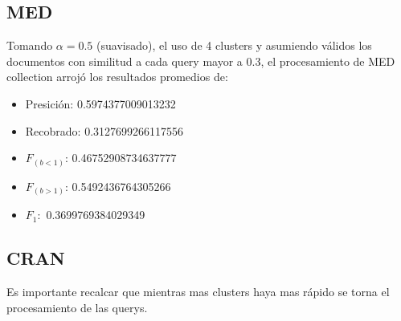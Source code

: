 \documentclass{llncs}
\begin{document}
	\subsection{MED}
	Tomando $\alpha=0.5$ (suavisado), el uso de 4 clusters y asumiendo v\'alidos los documentos con similitud a cada query mayor a 0.3, el procesamiento de MED collection arroj\'o los resultados promedios de:
	
	\begin{itemize}
		\item Presici\'on: 0.5974377009013232
		\item Recobrado: 0.3127699266117556
		\item $F_{(b<1)}$: 0.46752908734637777
		\item $F_{(b>1)}$: 0.5492436764305266
		\item $F_1:$ 0.3699769384029349
	\end{itemize}
	
	
	\subsection{CRAN}
	Es importante recalcar que mientras mas clusters haya mas r\'apido se torna el procesamiento de las querys. 
	
\end{document}
